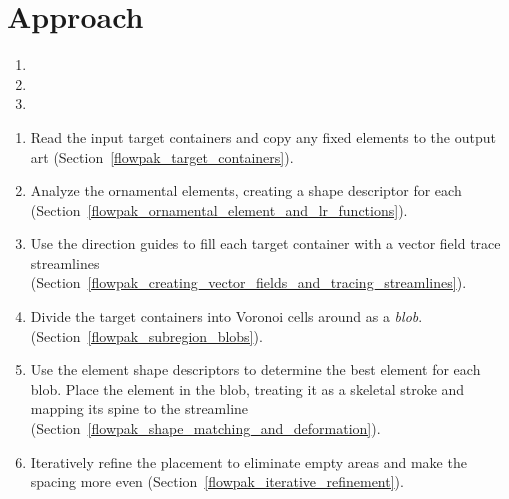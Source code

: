 \section{Approach}
\label{flowpak_approach}


\begin{enumerate}
\item {}
\item {}
\item {}
\end{enumerate}



\begin{enumerate}
  \item Read the input target containers and
  copy any fixed elements to the output art (Section~\ref{flowpak_target_containers}).
  \item Analyze the ornamental elements, creating a shape descriptor for each
   (Section~\ref{flowpak_ornamental_element_and_lr_functions}).
  \item Use the direction guides to fill each target container with a vector field  trace streamlines 
  (Section~\ref{flowpak_creating_vector_fields_and_tracing_streamlines}).
  \item Divide the target containers into Voronoi cells around  as a \textit{blob}. (Section~\ref{flowpak_subregion_blobs}).
  \item Use the element shape descriptors to determine the best element for each blob. 
        Place the element in the blob, treating it as a skeletal stroke and mapping its
        spine to the streamline (Section~\ref{flowpak_shape_matching_and_deformation}).
  \item Iteratively refine the placement to eliminate empty areas and make the spacing more even (Section~\ref{flowpak_iterative_refinement}).
\end{enumerate}

